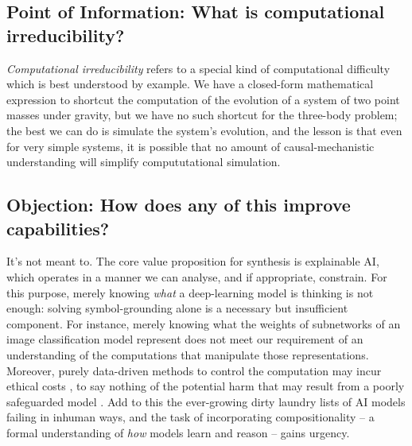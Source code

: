 \begin{fullwidth}
\begin{multicols}{2}
\subsection{\textbf{Point of Information:} What is computational irreducibility?}

\emph{Computational irreducibility} \citep{} refers to a special kind of computational difficulty which is best understood by example. We have a closed-form mathematical expression to shortcut the computation of the evolution of a system of two point masses under gravity, but we have no such shortcut for the three-body problem; the best we can do is simulate the system's evolution, and the lesson is that even for very simple systems, it is possible that no amount of causal-mechanistic understanding will simplify compututational simulation.

\subsection{\textbf{Objection:} How does any of this improve capabilities?}

It's not meant to. The core value proposition for synthesis is explainable AI, which operates in a manner we can analyse, and if appropriate, constrain. For this purpose, merely knowing \emph{what} a deep-learning model is thinking is not enough: solving symbol-grounding alone is a necessary but insufficient component. For instance, merely knowing what the weights of subnetworks of an image classification model represent \citep{} does not meet our requirement of an understanding of the computations that manipulate those representations. Moreover, purely data-driven methods to control the computation may incur ethical costs \citep{}, to say nothing of the potential harm that may result from a poorly safeguarded model \citep{}. Add to this the ever-growing dirty laundry lists of AI models failing \citep{} in inhuman ways, and the task of incorporating compositionality -- a formal understanding of \emph{how} models learn and reason -- gains urgency.\\


\end{multicols}
\end{fullwidth}

